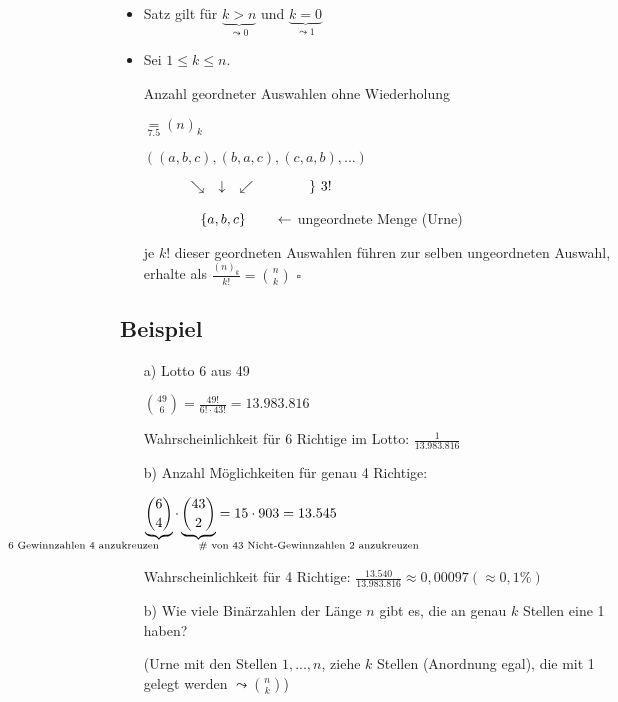 \documentclass[a4paper, 12pt, twoside] {article}
\begin{document}
\begin{itemize}
\item Satz gilt für $\underbrace{k > n}_{\leadsto 0}$ und $\underbrace{k = 0}_{\leadsto 1}$

\item Sei $1 \leq k \leq n$.

Anzahl geordneter Auswahlen ohne Wiederholung

$\underset{\text{7.5}}{=} (n)_k$

$((a,b,c),(b,a,c),(c,a,b), ...)$

\nopagebreak

$\text{\qquad\quad} \searrow \quad \downarrow \quad \swarrow \qquad \qquad \}\ 3!$

\nopagebreak

$\text{\qquad\qquad} \{a,b,c\}	\qquad \leftarrow$ ungeordnete Menge (Urne) %

je $k!$ dieser geordneten Auswahlen führen zur selben ungeordneten Auswahl, erhalte als $\frac{(n)_k}{k!} = \binom{n}{k}$ \hfill $\square$

\end{itemize}

\subsection[Beispiel (Lotto 6 aus 49)]{Beispiel}

\begin{itemize}
\item[a)] Lotto 6 aus 49

$\binom{49}{6} = \frac{49!}{6! \cdot 43!} = 13.983.816$

Wahrscheinlichkeit für 6 Richtige im Lotto: $\frac{1}{13.983.816}$

\item[b)] Anzahl Möglichkeiten für genau 4 Richtige:

$\underbrace{\binom{6}{4}}_{\mathllap{\text{\# von 6 Gewinnzahlen 4 anzukreuzen}}} \cdot \underbrace{\binom{43}{2}}_{\mathrlap{\text{\# von 43 Nicht-Gewinnzahlen 2 anzukreuzen}}} = 15 \cdot 903 = 13.545$

Wahrscheinlichkeit für 4 Richtige: $\frac{13.540}{13.983.816} \approx 0,00097 (\approx 0,1\%) $

\item[b)] Wie viele Binärzahlen der Länge $n$ gibt es, die an genau $k$ Stellen eine 1 haben?

(Urne mit den Stellen $1,...,n$, ziehe $k$ Stellen (Anordnung egal), die mit 1 gelegt werden $\leadsto \binom{n}{k}$)

\end{itemize}
\end{document}
